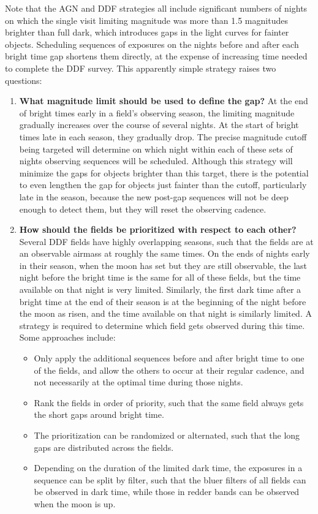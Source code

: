 \documentclass[DM,authoryear,toc]{lsstdoc}
\begin{document}
Note that the AGN and DDF strategies all include significant numbers of nights on which the single visit limiting magnitude was more than 1.5 magnitudes brighter than full dark, which introduces gaps in the light curves for fainter objects.
Scheduling sequences of exposures on the nights before and after each bright time gap shortens them directly, at the expense of increasing time needed to complete the DDF survey.
This apparently simple strategy raises two questions:
\begin{enumerate}
\item \textbf{What magnitude limit should be used to define the gap?} At the end of bright times early in a field's observing season, the limiting magnitude gradually increases over the course of several nights.
  At the start of bright times late in each season, they gradually drop.
  The precise magnitude cutoff being targeted will determine on which night within each of these sets of nights observing sequences will be scheduled.
  Although this strategy will minimize the gaps for objects brighter than this target, there is the potential to even lengthen the gap for objects just fainter than the cutoff, particularly late in the season, because the new post-gap sequences will not be deep enough to detect them, but they will reset the observing cadence.
\item \textbf{How should the fields be prioritized with respect to each other?} Several DDF fields have highly overlapping seasons, such that the fields are at an observable airmass at roughly the same times. On the ends of nights early in their season, when the moon has set but they are still observable, the last night before the bright time is the same for all of these fields, but the time available on that night is very limited. Similarly, the first dark time after a bright time at the end of their season is at the beginning of the night before the moon as risen, and the time available on that night is similarly limited. A strategy is required to determine which field gets observed during this time. Some approaches include:
  \begin{itemize}
  \item Only apply the additional sequences before and after bright time to one of the fields, and allow the others to occur at their regular cadence, and not necessarily at the optimal time during those nights.
  \item Rank the fields in order of priority, such that the same field always gets the short gaps around bright time.
  \item The prioritization can be randomized or alternated, such that the long gaps are distributed across the fields.
  \item Depending on the duration of the limited dark time, the exposures in a sequence can be split by filter, such that the bluer filters of all fields can be observed in dark time, while those in redder bands can be observed when the moon is up.
  \end{itemize}
\end{enumerate}
\end{document}
